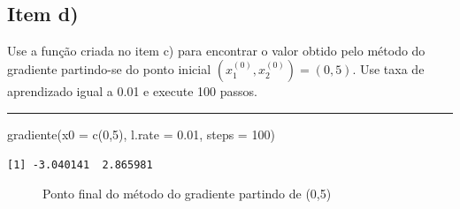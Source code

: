 \documentclass[
  a4paperpaper,
]{article}
\newenvironment{Shaded}{\begin{snugshade}}{\end{snugshade}}
\newcommand{\AttributeTok}[1]{\textcolor[rgb]{0.40,0.45,0.13}{#1}}
\newcommand{\DecValTok}[1]{\textcolor[rgb]{0.68,0.00,0.00}{#1}}
\newcommand{\FloatTok}[1]{\textcolor[rgb]{0.68,0.00,0.00}{#1}}
\newcommand{\FunctionTok}[1]{\textcolor[rgb]{0.28,0.35,0.67}{#1}}
\newcommand{\NormalTok}[1]{\textcolor[rgb]{0.00,0.23,0.31}{#1}}
\begin{document}
~

\subsection{Item d)}\label{item-d}

Use a função criada no item c) para encontrar o valor obtido pelo método
do gradiente partindo-se do ponto inicial
\(\left(x_1^{(0)} , x_2^{(0)} \right) = (0, 5)\). Use taxa de
aprendizado igual a 0.01 e execute 100 passos.

\begin{center}\rule{0.5\linewidth}{0.5pt}\end{center}

\begin{Shaded}
\begin{Highlighting}[]
\FunctionTok{gradiente}\NormalTok{(}\AttributeTok{x0 =} \FunctionTok{c}\NormalTok{(}\DecValTok{0}\NormalTok{,}\DecValTok{5}\NormalTok{), }\AttributeTok{l.rate =} \FloatTok{0.01}\NormalTok{, }\AttributeTok{steps =} \DecValTok{100}\NormalTok{)}
\end{Highlighting}
\end{Shaded}

\begin{verbatim}
[1] -3.040141  2.865981
\end{verbatim}

\begin{figure}[H]


\caption{\label{fig-q1d}Ponto final do método do gradiente partindo de
(0,5)}

\end{figure}%
\end{document}

